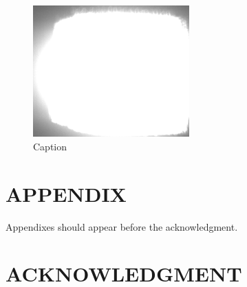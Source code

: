 \documentclass[letterpaper, 10 pt, conference]{ieeeconf}  %
\begin{document}
\begin{figure}[tpb]
\centering
\includegraphics[width=6cm]{./example_raw.png}
\caption{Caption}
\label{figurelabel}
\end{figure}
   
\addtolength{\textheight}{-12cm}   %







\section*{APPENDIX}

Appendixes should appear before the acknowledgment.

\section*{ACKNOWLEDGMENT}




\end{document}
